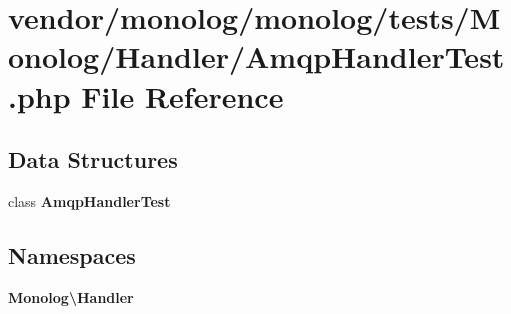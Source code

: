 \section{vendor/monolog/monolog/tests/\+Monolog/\+Handler/\+Amqp\+Handler\+Test.php File Reference}
\label{_amqp_handler_test_8php}
\subsection*{Data Structures}
\begin{DoxyCompactItemize}
\item 
class {\bf Amqp\+Handler\+Test}
\end{DoxyCompactItemize}
\subsection*{Namespaces}
\begin{DoxyCompactItemize}
\item 
 {\bf Monolog\textbackslash{}\+Handler}
\end{DoxyCompactItemize}
